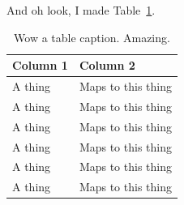         And oh look, I made Table~\ref{tab:example}.

        \begin{table}
            \centering
            \caption{Wow a table caption. Amazing.}
            \label{tab:example}
            \begin{tabular}{@{} l l @{}}
                \toprule
                \textbf{Column 1}    & \textbf{Column 2} \\
                \midrule
                A thing & Maps to this thing \\
                A thing & Maps to this thing \\
                A thing & Maps to this thing \\
                A thing & Maps to this thing \\
                A thing & Maps to this thing \\
                A thing & Maps to this thing \\
                \bottomrule
            \end{tabular}
        \end{table}
